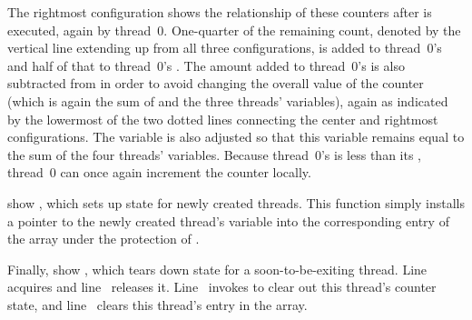 The rightmost configuration shows the relationship of these counters
after  is executed, again by thread~0.
One-quarter of the remaining count, denoted by the vertical line extending
up from all three configurations, is added to thread~0's
 and half of that to thread~0's .
The amount added to thread~0's  is also subtracted from
 in order to avoid changing the overall value of the
counter (which is again the sum of  and the three
threads'  variables), again as indicated by the lowermost
of the two dotted lines connecting the center and rightmost configurations.
The  variable is also adjusted so that this variable
remains equal to the sum of the four threads' 
variables.
Because thread~0's  is less than its ,
thread~0 can once again increment the counter locally.

\QuickQuizEnd

\begin{fcvref}
 show ,
which sets up state for
newly created threads.
This function simply installs
a pointer to the newly created thread's  variable into
the corresponding entry of the  array under the protection
of .
\end{fcvref}

\begin{fcvref}
Finally,  show ,
which tears down
state for a soon-to-be-exiting thread.
Line~ acquires  and
line~ releases it.
Line~ invokes 
to clear out this thread's
counter state, and line~ clears this thread's entry in the
 array.
\end{fcvref}

